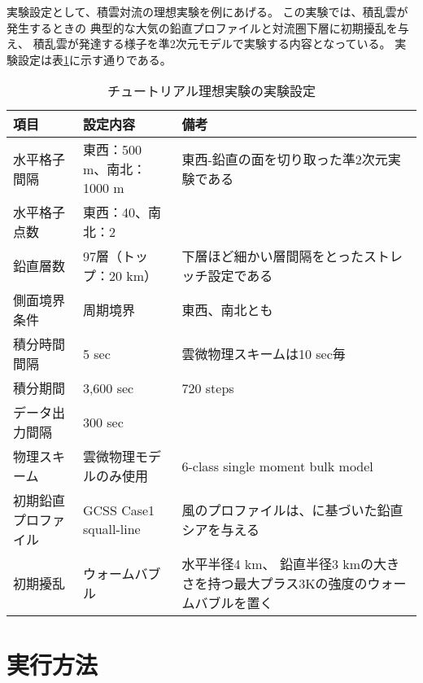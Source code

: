 実験設定として、積雲対流の理想実験を例にあげる。
この実験では、積乱雲が発生するときの
典型的な大気の鉛直プロファイルと対流圏下層に初期擾乱を与え、
積乱雲が発達する様子を準2次元モデルで実験する内容となっている。
実験設定は表\ref{tab:setting_ideal}に示す通りである。

\begin{table}[htb]
\begin{center}
\caption{チュートリアル理想実験の実験設定}
\begin{tabularx}{150mm}{|l|X|X|} \hline
 \rowcolor[gray]{0.9} 項目 & 設定内容 & 備考 \\ \hline
 水平格子間隔 & 東西：500 m、南北：1000 m & 東西-鉛直の面を切り取った準2次元実験である \\ \hline
 水平格子点数 & 東西：40、南北：2\footnotemark &  \\ \hline
 鉛直層数     & 97層（トップ：20 km）& 下層ほど細かい層間隔をとったストレッチ設定である \\ \hline
 側面境界条件 & 周期境界 & 東西、南北とも \\ \hline
 積分時間間隔 & 5 sec      & 雲微物理スキームは10 sec毎 \\ \hline
 積分期間     & 3,600 sec  & 720 steps \\ \hline
 データ出力間隔 & 300 sec  &  \\ \hline
 物理スキーム & 雲微物理モデルのみ使用 &
 6-class single moment bulk model \citep{tomita_2008} \\ \hline
 初期鉛直プロファイル & GCSS Case1 squall-line \citep{Redelsperger2000}&
 風のプロファイルは、\citet{Ooyama_2001}に基づいた鉛直シアを与える \\ \hline
 初期擾乱 & ウォームバブル & 水平半径4 km、
 鉛直半径3 kmの大きさを持つ最大プラス3Kの強度のウォームバブルを置く\\ \hline
\end{tabularx}
\label{tab:setting_ideal}
\end{center}
\end{table}



\section{実行方法}

